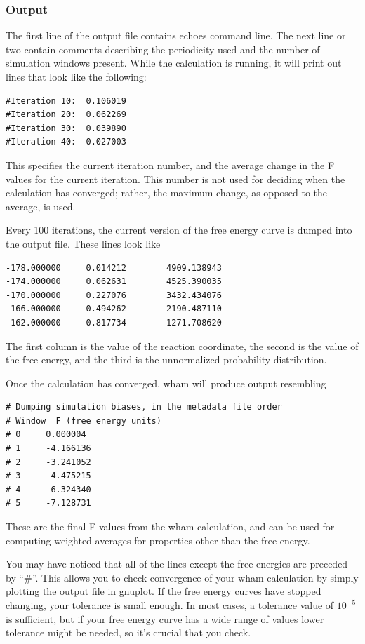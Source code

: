 \documentclass[12pt]{article}
\begin{document}
\subsubsection{Output}

The first line of the output file contains echoes command line.  The next
line or two contain comments describing the periodicity used and the number
of simulation windows present.
While the calculation is running, it will print out lines that look like
the following:
\begin{verbatim}
#Iteration 10:  0.106019
#Iteration 20:  0.062269
#Iteration 30:  0.039890
#Iteration 40:  0.027003
\end{verbatim}

This specifies the current iteration number, and the average change in the
F values for the current iteration.  This number is not used for deciding
when the calculation has converged; rather, the maximum change, as opposed
to the average, is used.

Every 100 iterations, the current version of the free energy curve is dumped
into the output file.  These lines look like

\begin{verbatim}
-178.000000     0.014212        4909.138943
-174.000000     0.062631        4525.390035
-170.000000     0.227076        3432.434076
-166.000000     0.494262        2190.487110
-162.000000     0.817734        1271.708620
\end{verbatim}

The first column is the value of the reaction coordinate, the second is the
value of the free energy, and the third is the unnormalized probability
distribution.

Once the calculation has converged, wham will produce output resembling

\begin{verbatim}
# Dumping simulation biases, in the metadata file order
# Window  F (free energy units)
# 0     0.000004
# 1     -4.166136
# 2     -3.241052
# 3     -4.475215
# 4     -6.324340
# 5     -7.128731
\end{verbatim}

These are the final F values from the wham calculation, and can be used for
computing weighted averages for properties other than the free energy.

You may have noticed that all of the lines except the free energies are preceded
by ``\#''.  This allows you to check convergence of your wham calculation by
simply plotting the output file in gnuplot.  If the free energy curves have
stopped changing, your tolerance is small enough. In most cases, a tolerance
value of $10^{-5}$ is sufficient, but if your free energy curve has a wide range
of values lower tolerance might be needed, so it's crucial that you check.
\end{document}
